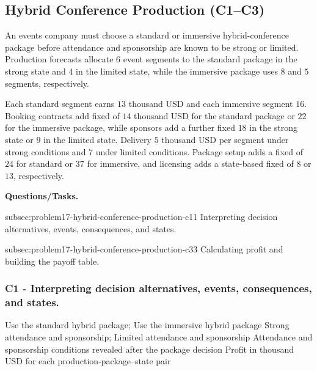 	\subsection{Hybrid Conference Production (C1--C3)}
	\label{sec:problem17-hybrid-conference-production-c1-c3}

	An events company must choose a standard or immersive hybrid-conference package before attendance and sponsorship are known to be strong or limited. Production forecasts allocate \(6\) event segments to the standard package in the strong state and \(4\) in the limited state, while the immersive package uses \(8\) and \(5\) segments, respectively.

	Each standard segment earns \(13\) thousand USD and each immersive segment \(16\). Booking contracts add fixed  of \(14\) thousand USD for the standard package or \(22\) for the immersive package, while sponsors add a further fixed \(18\) in the strong state or \(9\) in the limited state. Delivery  \(5\) thousand USD per segment under strong conditions and \(7\) under limited conditions. Package setup adds a fixed  of \(24\) for standard or \(37\) for immersive, and licensing adds a state-based fixed  of \(8\) or \(13\), respectively.

	\textbf{Questions/Tasks.}
	\begin{enumerate}
		\CriterionTask
		{subsec:problem17-hybrid-conference-production-c1}{1}
		{Interpreting decision alternatives, events, consequences, and states.}

		\CriterionTask
		{subsec:problem17-hybrid-conference-production-c3}{3}
		{Calculating profit and building the payoff table.}
	\end{enumerate}

	\subsubsection*{C1 - Interpreting decision alternatives, events, consequences, and states.}
	\label{subsec:problem17-hybrid-conference-production-c1}

	\DecisionElementsTable
	{Use the standard hybrid package; Use the immersive hybrid package}
	{Strong attendance and sponsorship; Limited attendance and sponsorship}
	{Attendance and sponsorship conditions revealed after the package decision}
	{Profit in thousand USD for each production-package--state pair}

